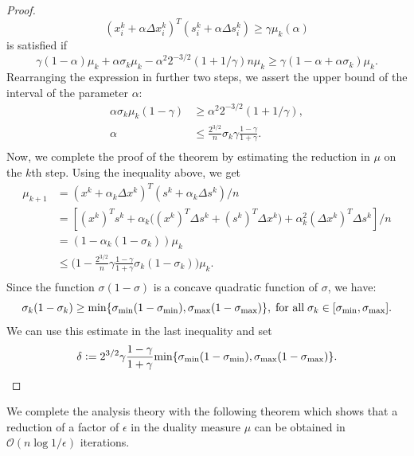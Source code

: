 \documentclass[a4paper,10 pt,titlepage,twoside]{book}
\theoremstyle{plain}
\theoremstyle{definition}
\theoremstyle{remark}
\begin{document}
\begin{proof}
\begin{equation*}
		(x_{i}^{k} + \alpha\Delta x_{i}^{k})^{T}(s_{i}^{k} + \alpha\Delta s_{i}^{k}) \geq \gamma\mu_{k}(\alpha)
	\end{equation*} is satisfied if \begin{equation*}
	\gamma(1-\alpha)\mu_{k} + \alpha\sigma_{k}\mu_{k} - \alpha^{2}2^{-3/2}(1 + 1/\gamma)n\mu_{k}\geq \gamma(1 - \alpha +\alpha\sigma_{k})\mu_{k}.
	\end{equation*}
	Rearranging the expression in further two steps, we assert the upper bound of the interval of the parameter $\alpha$:
	\begin{align*}
	\alpha\sigma_{k}\mu_{k}(1-\gamma)&\geq\alpha^{2}2^{-3/2}(1+1/\gamma),\\
	\alpha&\leq \frac{2^{3/2}}{n} \sigma_{k}\gamma\frac{1-\gamma}{1+\gamma}.\\		
	\end{align*}
	Now, we complete the proof of the theorem by estimating the reduction in $\mu$ on the $k$th step. Using the inequality above, we get
	\begin{align*}
	\mu_{k+1}& = (x^{k} + \alpha_{k}\Delta x^{k})^{T}(s^{k} + \alpha_{k}\Delta s^{k})/n\\
	& = [(x^{k})^{T}s^{k} + \alpha_{k}\big((x^{k})^{T}\Delta s^{k} + (s^{k})^{T}\Delta x^{k}\big) +\alpha^{2}_{k}(\Delta x^{k})^{T}\Delta s^{k}]/n\\
	& = (1 - \alpha_{k}(1-\sigma_{k}))\mu_{k}\\
	& \leq \Big(1 - \frac{2^{3/2}}{n}\gamma\frac{1-\gamma}{1+\gamma}\sigma_{k}(1-\sigma_{k})\Big)\mu_{k}.\\
	\end{align*}
	Since the function $\sigma(1 - \sigma)$ is a concave quadratic function of $\sigma$, we have:
	\begin{equation*}
	\sigma_{k}(1-\sigma_{k})\geq \text{min}\{\sigma_{\text{min}}(1-\sigma_{\text{min}}),\sigma_{\text{max}}(1-\sigma_{\text{max}})\}, \text{\;for all\;}\sigma_{k}\in[\sigma_{\text{min}},\sigma_{\text{max}}].
	\end{equation*}
	We can use this estimate in the last inequality and set
	\begin{equation*}
	\delta \vcentcolon=2^{3/2}\gamma\frac{1-\gamma}{1+\gamma}\text{\text{min}}\{\sigma_{\text{min}}(1-\sigma_{\text{min}}),\sigma_{\text{max}}(1-\sigma_{\text{max}})\}.
	\end{equation*}
\end{proof}
We complete the analysis theory with the following theorem which shows that a reduction of a factor of $\epsilon$ in the duality measure $\mu$ can be obtained in $\mathcal{O}(n\log{1/\epsilon})$ iterations.
\end{document}
